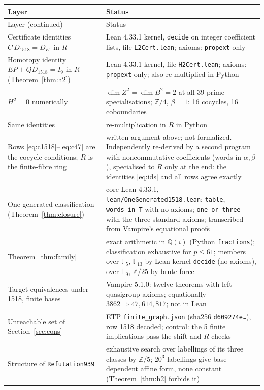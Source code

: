 \documentclass[11pt]{article}
\theoremstyle{remark}\newtheorem*{remark}{Remark}
\newcommand{\Z}{\mathbb{Z}}
\newcommand{\Q}{\mathbb{Q}}
\newcommand{\F}{\mathbb{F}}
\begin{document}
\begingroup\small
\begin{longtable}{p{} p{}}
\toprule
Layer & Status \\
\midrule
\endfirsthead
\toprule
Layer (continued) & Status \\
\midrule
\endhead
Certificate identities $C\,D_{1518}=D_{E'}$ in $R$ & Lean 4.33.1 kernel, \texttt{decide} on integer coefficient lists, file \texttt{L2Cert.lean}; axioms: \texttt{propext} only \\
Homotopy identity $EP+QD_{1518}=I_9$ in $R$ (Theorem~\ref{thm:h2}) & Lean 4.33.1 kernel, file \texttt{H2Cert.lean}; axioms: \texttt{propext} only; also re-multiplied in Python \\
$H^{2}=0$ numerically & $\dim Z^{2}=\dim B^{2}=2$ at all 39 prime specialisations; $\Z/4$, $\beta=1$: 16 cocycles, 16 coboundaries \\
Same identities & re-multiplication in $R$ in Python \\
Rows \eqref{eq:c1518}--\eqref{eq:c47} are the cocycle conditions; $R$ is the finite-fibre ring & written argument above; not formalized. Independently re-derived by a second program with noncommutative coefficients (words in $\alpha,\beta$), specialised to $R$ only at the end: the identities \eqref{eq:ids} and all rows agree exactly \\
One-generated classification (Theorem~\ref{thm:closure}) & core Lean 4.33.1, \texttt{lean/OneGenerated1518.lean}: \texttt{table}, \texttt{words\_in\_T} with no axioms; \texttt{one\_or\_three} with the three standard axioms; transcribed from Vampire's equational proofs \\
Theorem~\ref{thm:family} & exact arithmetic in $\Q(i)$ (Python \texttt{fractions}); classification exhaustive for $p\le61$; members over $\F_5$, $\F_{13}$ by Lean kernel \texttt{decide} (no axioms), over $\F_9$, $\Z/25$ by brute force \\
Target equivalences under 1518, finite bases & Vampire 5.1.0: twelve theorems with left-quasigroup axioms; equationally $3862\Rightarrow47,614,817$; not in Lean \\
Unreachable set of Section~\ref{sec:cons} & ETP \texttt{finite\_graph.json} (sha256 \texttt{d609274e\ldots}), row 1518 decoded; control: the 5 finite implications pass the shift and $R$ checks \\
Structure of \texttt{Refutation939} & exhaustive search over labellings of its three classes by $\Z/5$; $20^{3}$ labellings give base-dependent affine form, none constant (Theorem~\ref{thm:h2} forbids it) \\

\end{longtable}
\end{document}
